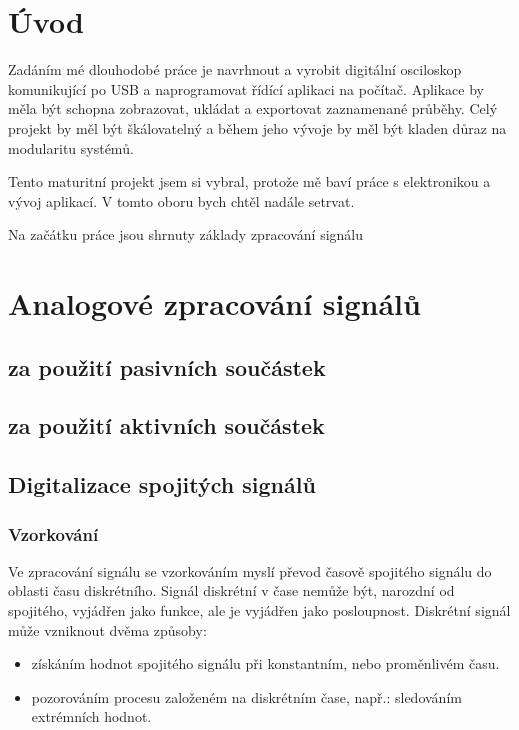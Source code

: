\documentclass[oneside,12pt,a4paper]{template/SPSTemplate} %
\begin{document}
	\makebeginning

	\tableofcontents
	
	\chapter{Úvod}

	Zadáním mé dlouhodobé práce je navrhnout a vyrobit digitální osciloskop komunikující po USB a naprogramovat řídící aplikaci na počítač. 
	Aplikace by měla být schopna zobrazovat, ukládat a exportovat zaznamenané průběhy. Celý projekt by měl být škálovatelný a během jeho vývoje by měl být kladen důraz na modularitu systémů. 
	
	Tento maturitní projekt jsem si vybral, protože mě baví práce s elektronikou a vývoj aplikací. V tomto oboru bych chtěl nadále setrvat.

	Na začátku práce jsou shrnuty základy zpracování signálu

	
	\chapter{Analogové zpracování signálů}

		\section{za použití pasivních součástek}		
		
		\section{za použití aktivních součástek}
	
		\section{Digitalizace spojitých signálů}
		
			\subsection{Vzorkování}
		Ve zpracování signálu se vzorkováním myslí převod časově spojitého signálu do oblasti času diskrétního. 
		Signál diskrétní v čase nemůže být, narozdní od spojitého, vyjádřen jako funkce, ale je vyjádřen jako posloupnost.
		Diskrétní signál může vzniknout dvěma způsoby:
		\begin{itemize}
			\item získáním hodnot spojitého signálu při konstantním, nebo proměnlivém času. \cite{discretization_oppenheim}
			\item pozorováním procesu založeném na diskrétním čase, např.: sledováním extrémních hodnot.
		\end{itemize}
		
\end{document}
